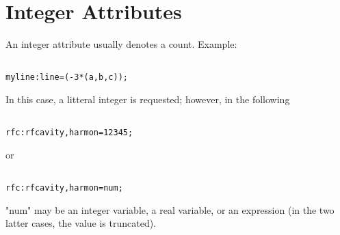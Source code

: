
\section{Integer Attributes}

An integer attribute usually denotes a count. Example: 
\begin{verbatim}

myline:line=(-3*(a,b,c));
\end{verbatim} 

In this case, a litteral integer is requested; however, in the following 
\begin{verbatim}

rfc:rfcavity,harmon=12345;
\end{verbatim} 

or 
\begin{verbatim}

rfc:rfcavity,harmon=num;
\end{verbatim} 

"num" may be an integer variable, a real variable, or an expression  (in
the two latter cases, the value is truncated). 


